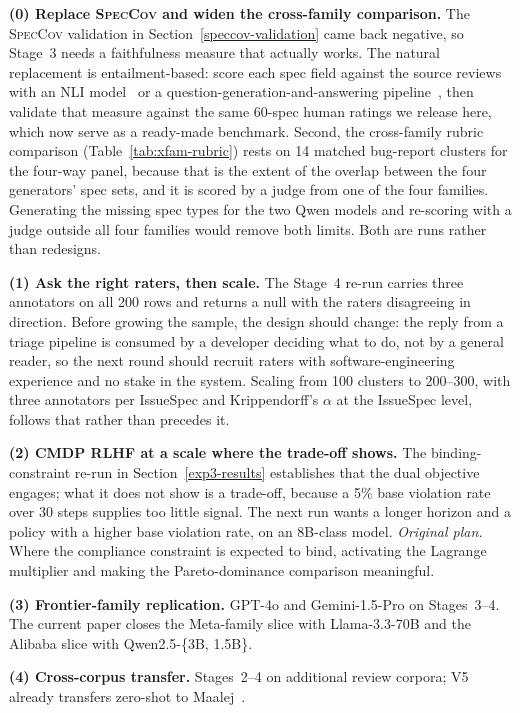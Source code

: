 \documentclass[preprint,12pt]{elsarticle}
\begin{document}
\textbf{(0) Replace \textsc{SpecCov} and widen the cross-family comparison.} The
\textsc{SpecCov} validation in Section~\ref{speccov-validation} came back negative, so Stage~3
needs a faithfulness measure that actually works. The natural replacement is entailment-based:
score each spec field against the source reviews with an NLI model~\cite{laban2022summac,
honovich2022true} or a question-generation-and-answering pipeline~\cite{durmus2020feqa}, then
validate that measure against the same 60-spec human ratings we release here, which now serve as
a ready-made benchmark. Second, the cross-family rubric comparison
(Table~\ref{tab:xfam-rubric}) rests on 14 matched bug-report clusters for the four-way panel,
because that is the extent of the overlap between the four generators' spec sets, and it is
scored by a judge from one of the four families. Generating the missing spec types for the two
Qwen models and re-scoring with a judge outside all four families would remove both limits.
Both are runs rather than redesigns.

\textbf{(1) Ask the right raters, then scale.} The Stage~4 re-run carries three annotators on all 200 rows and returns a null with the raters disagreeing in direction. Before growing the sample, the design should change: the reply from a triage pipeline is consumed by a developer deciding what to do, not by a general reader, so the next round should recruit raters with software-engineering experience and no stake in the system. Scaling from 100 clusters to 200--300, with three annotators per IssueSpec and Krippendorff's $\alpha$ at the IssueSpec level, follows that rather than precedes it.

\textbf{(2) CMDP RLHF at a scale where the trade-off shows.} The binding-constraint re-run in
Section~\ref{exp3-results} establishes that the dual objective engages; what it does not show is
a trade-off, because a 5\% base violation rate over 30 steps supplies too little signal. The next
run wants a longer horizon and a policy with a higher base violation rate, on an 8B-class model.
\emph{Original plan.} Where the compliance constraint is expected to bind, activating the Lagrange multiplier and making the Pareto-dominance comparison meaningful.

\textbf{(3) Frontier-family replication.} GPT-4o and Gemini-1.5-Pro on Stages~3--4. The current paper closes the Meta-family slice with Llama-3.3-70B and the Alibaba slice with Qwen2.5-\{3B, 1.5B\}.

\textbf{(4) Cross-corpus transfer.} Stages~2--4 on additional review corpora; V5 already transfers zero-shot to Maalej~\cite{maalej2015bug}.
\end{document}
